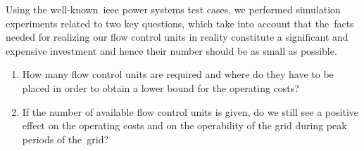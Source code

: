 Using the well-known~\gls{ieee} power systems test cases, we performed
simulation experiments related to two key questions, which take into account
that the~\gls{facts} needed for realizing our flow control units in reality
constitute a significant and expensive investment and hence their number should
be as small as possible.
%
%
\begin{enumerate}[(Q1)]%
    \item How many flow control units are required and where do they have to be
    placed in order to obtain a lower bound for the operating costs?
    \label{ch:facts:quest:main1}
    \item If the number of available flow control units is given, do we still
    see a positive effect on the operating costs and on the operability of the
    grid during peak periods of the~grid?
    \label{ch:facts:quest:main2}
\end{enumerate}%
% 
